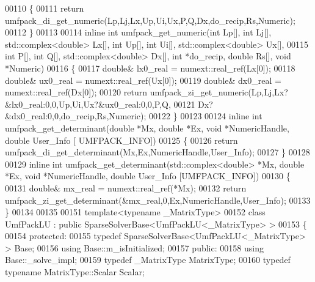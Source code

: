 \begin{DoxyCode}
00110 \{
00111   \textcolor{keywordflow}{return} umfpack\_di\_get\_numeric(Lp,Lj,Lx,Up,Ui,Ux,P,Q,Dx,do\_recip,Rs,Numeric);
00112 \}
00113 
00114 \textcolor{keyword}{inline} \textcolor{keywordtype}{int} umfpack\_get\_numeric(\textcolor{keywordtype}{int} Lp[], \textcolor{keywordtype}{int} Lj[], std::complex<double> Lx[], \textcolor{keywordtype}{int} Up[], \textcolor{keywordtype}{int} Ui[], 
      std::complex<double> Ux[],
00115                                \textcolor{keywordtype}{int} P[], \textcolor{keywordtype}{int} Q[], std::complex<double> Dx[], \textcolor{keywordtype}{int} *do\_recip, \textcolor{keywordtype}{double} Rs[], \textcolor{keywordtype}{
      void} *Numeric)
00116 \{
00117   \textcolor{keywordtype}{double}& lx0\_real = numext::real\_ref(Lx[0]);
00118   \textcolor{keywordtype}{double}& ux0\_real = numext::real\_ref(Ux[0]);
00119   \textcolor{keywordtype}{double}& dx0\_real = numext::real\_ref(Dx[0]);
00120   \textcolor{keywordflow}{return} umfpack\_zi\_get\_numeric(Lp,Lj,Lx?&lx0\_real:0,0,Up,Ui,Ux?&ux0\_real:0,0,P,Q,
00121                                 Dx?&dx0\_real:0,0,do\_recip,Rs,Numeric);
00122 \}
00123 
00124 \textcolor{keyword}{inline} \textcolor{keywordtype}{int} umfpack\_get\_determinant(\textcolor{keywordtype}{double} *Mx, \textcolor{keywordtype}{double} *Ex, \textcolor{keywordtype}{void} *NumericHandle, \textcolor{keywordtype}{double} User\_Info [
      UMFPACK\_INFO])
00125 \{
00126   \textcolor{keywordflow}{return} umfpack\_di\_get\_determinant(Mx,Ex,NumericHandle,User\_Info);
00127 \}
00128 
00129 \textcolor{keyword}{inline} \textcolor{keywordtype}{int} umfpack\_get\_determinant(std::complex<double> *Mx, \textcolor{keywordtype}{double} *Ex, \textcolor{keywordtype}{void} *NumericHandle, \textcolor{keywordtype}{double} 
      User\_Info [UMFPACK\_INFO])
00130 \{
00131   \textcolor{keywordtype}{double}& mx\_real = numext::real\_ref(*Mx);
00132   \textcolor{keywordflow}{return} umfpack\_zi\_get\_determinant(&mx\_real,0,Ex,NumericHandle,User\_Info);
00133 \}
00134 
00135 
00151 \textcolor{keyword}{template}<\textcolor{keyword}{typename} \_MatrixType>
00152 \textcolor{keyword}{class }UmfPackLU : \textcolor{keyword}{public} SparseSolverBase<UmfPackLU<\_MatrixType> >
00153 \{
00154   \textcolor{keyword}{protected}:
00155     \textcolor{keyword}{typedef} SparseSolverBase<UmfPackLU<\_MatrixType> > Base;
00156     \textcolor{keyword}{using} Base::m\_isInitialized;
00157   \textcolor{keyword}{public}:
00158     \textcolor{keyword}{using} Base::\_solve\_impl;
00159     \textcolor{keyword}{typedef} \_MatrixType MatrixType;
00160     \textcolor{keyword}{typedef} \textcolor{keyword}{typename} MatrixType::Scalar Scalar;

\end{DoxyCode}
